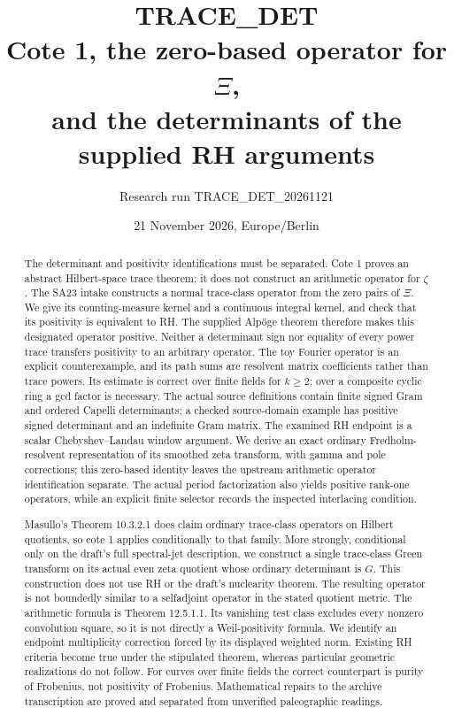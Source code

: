 \documentclass[11pt,a4paper]{article}
\title{\textbf{TRACE\_DET}\\Cote 1, the zero-based operator for $\Xi$,\\and the determinants of the supplied RH arguments}
\author{Research run TRACE\_DET\_20261121}
\date{21 November 2026, Europe/Berlin}
\begin{document}
\maketitle
\begin{abstract}
The determinant and positivity identifications must be separated. Cote 1 proves an abstract Hilbert-space trace theorem; it does not construct an arithmetic operator for $\zeta$. The SA23 intake constructs a normal trace-class operator from the zero pairs of $\Xi$. We give its counting-measure kernel and a continuous integral kernel, and check that its positivity is equivalent to RH. The supplied Alp\"oge theorem therefore makes this designated operator positive. Neither a determinant sign nor equality of every power trace transfers positivity to an arbitrary operator. The toy Fourier operator is an explicit counterexample, and its path sums are resolvent matrix coefficients rather than trace powers. Its estimate is correct over finite fields for $k\ge2$; over a composite cyclic ring a gcd factor is necessary. The actual source definitions contain finite signed Gram and ordered Capelli determinants; a checked source-domain example has positive signed determinant and an indefinite Gram matrix. The examined RH endpoint is a scalar Chebyshev--Landau window argument. We derive an exact ordinary Fredholm-resolvent representation of its smoothed zeta transform, with gamma and pole corrections; this zero-based identity leaves the upstream arithmetic operator identification separate. The actual period factorization also yields positive rank-one operators, while an explicit finite selector records the inspected interlacing condition.

Masullo's Theorem 10.3.2.1 does claim ordinary trace-class operators on Hilbert quotients, so cote 1 applies conditionally to that family. More strongly, conditional only on the draft's full spectral-jet description, we construct a single trace-class Green transform on its actual even zeta quotient whose ordinary determinant is $G$. This construction does not use RH or the draft's nuclearity theorem. The resulting operator is not boundedly similar to a selfadjoint operator in the stated quotient metric. The arithmetic formula is Theorem 12.5.1.1. Its vanishing test class excludes every nonzero convolution square, so it is not directly a Weil-positivity formula. We identify an endpoint multiplicity correction forced by its displayed weighted norm. Existing RH criteria become true under the stipulated theorem, whereas particular geometric realizations do not follow. For curves over finite fields the correct counterpart is purity of Frobenius, not positivity of Frobenius. Mathematical repairs to the archive transcription are proved and separated from unverified paleographic readings.
\end{abstract}
\clearpage
{\small\setlength{\parskip}{0pt}\tableofcontents}
\clearpage
\end{document}
